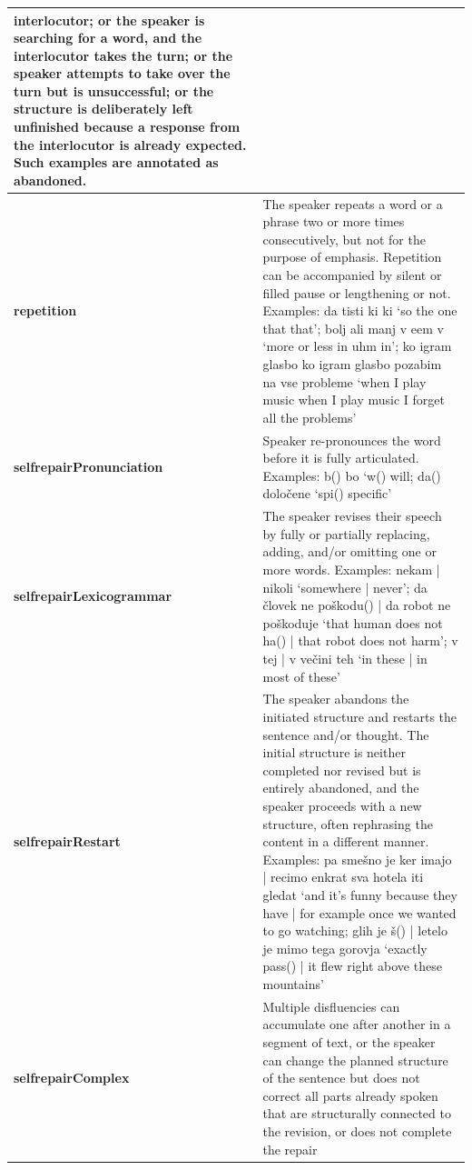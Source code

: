 \documentclass[a4paper,oneside,12pt]{article}
\begin{document}
\begin{longtable}{|l|p{12cm}|}
  interlocutor; or the speaker is searching for a word, and the interlocutor
  takes the turn; or the speaker attempts to take over the turn but is
  unsuccessful; or the structure is deliberately left unfinished because a
  response from the interlocutor is already expected. Such examples are
  annotated as abandoned.                                                                \\ \hline
  \textbf{repetition}              & The speaker repeats a word or a phrase two or more
  times consecutively, but not for the purpose of emphasis. Repetition can be
  accompanied by silent or filled pause or lengthening or not. Examples: da
  tisti ki ki `so the one that that'; bolj ali manj v eem v `more or less in uhm
  in'; ko igram glasbo ko igram glasbo pozabim na vse probleme `when I play
  music when I play music I forget all the problems'                                     \\ \hline
  \textbf{selfrepairPronunciation} & Speaker re-pronounces the word before it is fully
  articulated. Examples: b() bo `w() will; da() določene `spi() specific'                \\
  \hline
  \textbf{selfrepairLexicogrammar} & The speaker revises their speech by fully or
  partially replacing, adding, and/or omitting one or more words. Examples:
  nekam | nikoli `somewhere | never'; da človek ne poškodu() | da robot ne
  poškoduje `that human does not ha() | that robot does not harm'; v tej | v
  večini teh `in these | in most of these'                                               \\ \hline
  \textbf{selfrepairRestart}       & The speaker abandons the initiated structure and
  restarts the sentence and/or thought. The initial structure is neither
  completed nor revised but is entirely abandoned, and the speaker proceeds with
  a new structure, often rephrasing the content in a different manner. Examples:
  pa smešno je ker imajo | recimo enkrat sva hotela iti gledat `and it's funny
  because they have | for example once we wanted to go watching; glih je š() |
  letelo je mimo tega gorovja `exactly pass() | it flew right above these
  mountains'                                                                             \\ \hline
  \textbf{selfrepairComplex}       & Multiple disfluencies can accumulate one after
  another in a segment of text, or the speaker can change the planned structure
  of the sentence but does not correct all parts already spoken that are
  structurally connected to the revision, or does not complete the repair

\end{longtable}
\end{document}

